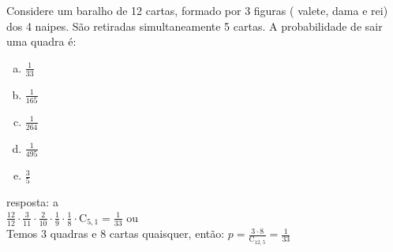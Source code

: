 \begin{ex}
 Considere um baralho de 12 cartas, formado por 3 figuras ( valete, dama e rei) dos 4 naipes. São retiradas simultaneamente 5 cartas. A probabilidade de sair uma quadra é:
    \begin{enumerate}[(a)]
    \item $\frac{1}{33}$
    \item $\frac{1}{165}$
    \item $\frac{1}{264}$
    \item $\frac{1}{495}$
    \item $\frac{3}{5}$
    \end{enumerate}
     \begin{sol}
       resposta: a\\
       $\frac{12}{12}\cdot\frac{3}{11}\cdot\frac{2}{10}\cdot\frac{1}{9}\cdot\frac{1}{8}\cdot\mathrm{C}_{5,1}=\frac{1}{33}$\hspace{0.5cm} ou \\
       Temos 3 quadras e 8 cartas quaisquer, então:
       $p= \frac{3\cdot8}{\mathrm{C}_{{12},5}}=\frac{1}{33}$
     \end{sol}
\end{ex}